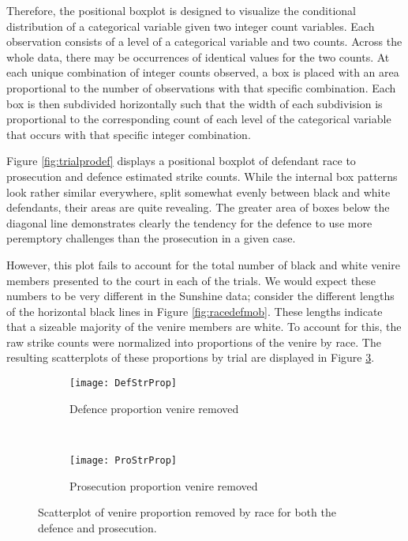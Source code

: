 Therefore, the positional boxplot is designed to visualize the conditional distribution of a categorical variable given two
integer count variables. Each observation consists of a level of a categorical variable and two counts. Across the whole data,
there may be occurrences of identical values for the two counts. At each unique combination of integer counts observed, a box is
placed with an area proportional to the number of observations with that specific combination. Each box is then subdivided
horizontally such that the width of each subdivision is proportional to the corresponding count of each level of the categorical
variable that occurs with that specific integer combination.

Figure \ref{fig:trialprodef} displays a positional boxplot of defendant race to prosecution and defence estimated strike
counts. While the internal box patterns look rather similar everywhere, split somewhat evenly between black and white defendants,
their areas are quite revealing. The greater area of boxes below the diagonal line demonstrates clearly the tendency for the defence to use more peremptory challenges than the prosecution in a given case.

However, this plot fails to account for
the total number of black and white venire members presented to the court in each of the trials. We would expect these numbers to be very different in the Sunshine data; consider the different lengths of the horizontal black lines in Figure \ref{fig:racedefmob}. These lengths indicate that a sizeable majority of the venire members are white. To account for this, the raw strike counts were normalized into proportions of the venire by race. The resulting scatterplots
of these proportions by trial are displayed in Figure \ref{fig:defproprop}.

\begin{figure}[h!]
  \centering
  \begin{subfigure}{0.45\textwidth}
    \texttt{[image: DefStrProp]}
    \caption{\footnotesize Defence proportion venire removed}
    \label{fig:defraceprop}
  \end{subfigure}
  ~
  \begin{subfigure}{0.45\textwidth}
    \texttt{[image: ProStrProp]}
    \caption{\footnotesize Prosecution proportion venire removed}
    \label{fig:proraceprop}
  \end{subfigure}
  \caption[Racial Strike Proportions by Party]
  {\footnotesize Scatterplot of venire proportion removed by race for both the defence and prosecution.}
  \label{fig:defproprop}
\end{figure}

